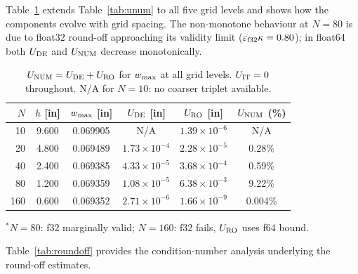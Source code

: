 \documentclass[10pt,twocolumn]{article}
\begin{document}
Table~\ref{tab:unum_all} extends Table~\ref{tab:unum} to all five grid levels
and shows how the components evolve with grid spacing.
The non-monotone behaviour at $N=80$ is due to float32 round-off approaching
its validity limit ($\varepsilon_{\rm f32}\kappa=0.80$); in float64 both
$U_{\rm DE}$ and $U_{\rm NUM}$ decrease monotonically.

\begin{table}[h!]
\centering
\caption{$U_{\rm NUM}=U_{\rm DE}+U_{\rm RO}$ for $w_{\rm max}$ at all grid levels.
  $U_{\rm IT}=0$ throughout.  N/A for $N=10$: no coarser triplet available.}
\label{tab:unum_all}
\footnotesize
\setlength{\tabcolsep}{4pt}
\begin{tabular}{@{}rccccc@{}}
\toprule
$N$ & $h$ [in] & $w_{\rm max}$ [in] & $U_{\rm DE}$ [in] & $U_{\rm RO}$ [in] & $U_{\rm NUM}$ (\%)\\
\midrule
 10 & 9.600 & 0.069905 & N/A & $1.39{\times}10^{-6}$ & N/A\\
 20 & 4.800 & 0.069489 & $1.73{\times}10^{-4}$ & $2.28{\times}10^{-5}$ & 0.28\%\\
 40 & 2.400 & 0.069385 & $4.33{\times}10^{-5}$ & $3.68{\times}10^{-4}$ & 0.59\%\\
 80 & 1.200 & 0.069359 & $1.08{\times}10^{-5}$ & $6.38{\times}10^{-3}$ & 9.22\%\\
160 & 0.600 & 0.069352 & $2.71{\times}10^{-6}$ & $1.66{\times}10^{-9}$ & 0.004\%\\
\bottomrule
\end{tabular}
{\footnotesize $^*N{=}80$: f32 marginally valid; $N{=}160$: f32 fails, $U_{\rm RO}$ uses f64 bound.}
\end{table}

Table~\ref{tab:roundoff} provides the condition-number analysis underlying
the round-off estimates.
\end{document}
